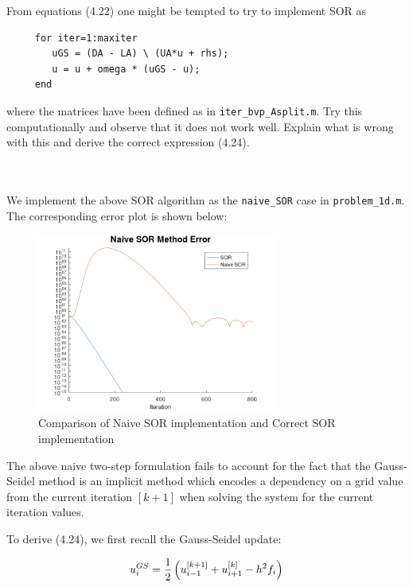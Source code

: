 From equations (4.22) one might be tempted to try to implement SOR as
\begin{verbatim}
     for iter=1:maxiter
        uGS = (DA - LA) \ (UA*u + rhs);
        u = u + omega * (uGS - u);
     end
\end{verbatim}

where the matrices have been defined as in \verb+iter_bvp_Asplit.m+. Try this computationally and observe that it does
not work well. Explain what is wrong with this and derive the correct expression (4.24).

\begin{solution}\ \\\\
    We implement the above SOR algorithm as the \texttt{naive\_SOR} case in \texttt{problem\_1d.m}. The corresponding
    error plot is shown below:

    \begin{figure}[h]
        \centering
        \includegraphics[width=0.7\textwidth]{problem_1d_naive_sor_matrix_splitting_error_800_iterations.png}
        \caption{Comparison of Naive SOR implementation and Correct SOR implementation}
    \end{figure}

    The above naive two-step formulation fails to account for the fact that the Gauss-Seidel method is an implicit
    method which encodes a dependency on a grid value from the current iteration $[k+1]$ when solving the system for
    the current iteration values. 

    To derive (4.24), we first recall the Gauss-Seidel update:

    \begin{equation}
        u_i^{GS} = \frac{1}{2} \left( u_{i-1}^{[k+1]} + u_{i+1}^{[k]} - h^2 f_i \right) \\
    \end{equation}


\end{solution}
